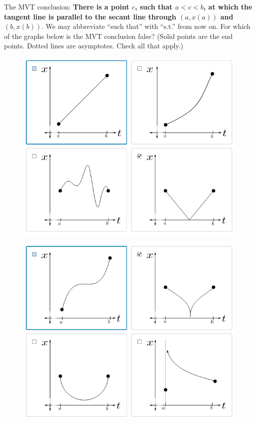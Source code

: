\documentclass[pdftex, brazil, 12pt, twoside]{article}
\begin{document}
\begin{Exercise}[title={How the Mean Value Theorem can go wrong}]
  \noindent The MVT conclusion: \textbf{There is a point $c$, such that $a<c<b$, at
    which the tangent line is parallel to the secant line through $(a, x(a))$ and
    $(b, x(b))$}. We may abbreviate ``such that'' with ``s.t.'' from now on.
  For which of the graphs below is the MVT conclusion false? (Solid points are
  the end points. Dotted lines are asymptotes. Check all that apply.) 
  \begin{figure}[H]
    \begin{center}
      \label{fig:mvt-hypot-1}
      \includegraphics[scale=0.4]{imagens/unit-1/u1-m1-00012.png}
    \end{center}
  \end{figure}
  \begin{figure}[H]
    \begin{center}
      \label{fig:mvt-hypot-2}
      \includegraphics[scale=0.4]{imagens/unit-1/u1-m1-00013.png}

\end{center}
\end{figure}
\end{Exercise}
\end{document}
